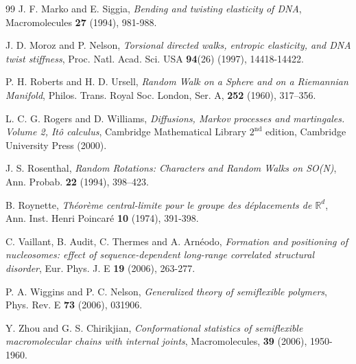 \documentclass[a4paper,reqno,11pt]{amsart}
\numberwithin{equation}{section}
\newcommand{\R}{\mathbb{R}}
\begin{document}
\begin{thebibliography}{99}
J. F. Marko and E.
Siggia, \emph{Bending and twisting elasticity of DNA},
Macromolecules  {\bf  27} (1994), 981-988.

J. D. Moroz and P. Nelson,
\emph{
Torsional directed walks, entropic elasticity, and DNA twist stiffness},
Proc. Natl. Acad. Sci. USA {\bf 94}(26) (1997), 14418-14422.



 P. H. Roberts and H. D. Ursell,
\textit{Random Walk on a Sphere and on a Riemannian Manifold},
Philos. Trans. Royal Soc. London, Ser. A, {\bf 252} (1960), 317--356.

L. C. G. Rogers and D. Williams,
\emph{Diffusions, Markov processes and martingales.
Volume 2, It\^o calculus},
Cambridge Mathematical Library
$2^{\textrm{nd}}$ edition, Cambridge University Press (2000).



 J. S. Rosenthal,
\textit{Random Rotations: Characters and Random Walks on SO(N)},
Ann. Probab. {\bf 22} (1994), 398--423.

B. Roynette, \emph{Th\'eor\`eme central-limite pour le groupe des
d\'eplacements de $\R^d$}, Ann. Inst. Henri Poincar\'e {\bf 10} (1974), 391-398.


C. Vaillant,  B. Audit, C. Thermes and A. Arn\'eodo,
\emph{Formation and positioning of nucleosomes: effect of sequence-dependent long-range correlated structural disorder},
Eur. Phys. J. E {\bf 19} (2006), 263-277.

P. A. Wiggins and P. C. Nelson,
\emph{Generalized theory of semiflexible polymers},  Phys. Rev.  E {\bf 73} (2006), 031906.

Y. Zhou and G. S. Chirikjian,
\emph{Conformational statistics of semiflexible macromolecular chains with internal joints},
Macromolecules, {\bf 39} (2006), 1950-1960.








\end{thebibliography}
\end{document}
